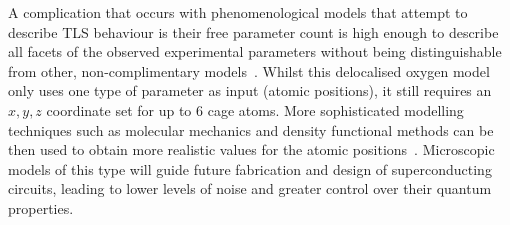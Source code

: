 A complication that occurs with phenomenological models that attempt to describe TLS behaviour is their free parameter count is high enough to describe all facets of the observed experimental parameters without being distinguishable from other, non-complimentary models~\cite{Cole2010}.
Whilst this delocalised oxygen model only uses one type of parameter as input (atomic positions), it still requires an $x, y, z$  coordinate set for up to $6$ cage atoms.
More sophisticated modelling techniques such as molecular mechanics and density functional methods can be then used to obtain more realistic values for the atomic positions~\cite{DuBois2013}.
Microscopic models of this type will guide future fabrication and design of superconducting circuits, leading to lower levels of noise and greater control over their quantum properties. 